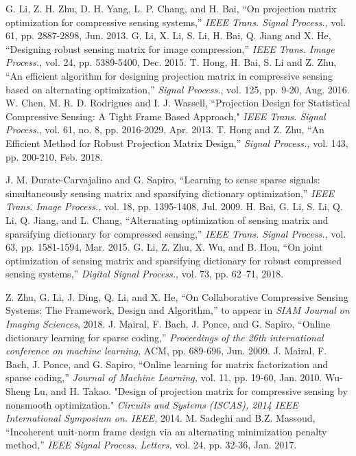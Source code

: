 \documentclass[final,5p,times,twocolumn]{elsarticle}
\begin{document}
\begin{thebibliography}{255}
G. Li, Z. H. Zhu, D. H. Yang, L. P. Chang, and H. Bai, ``On projection matrix optimization for compressive sensing systems,'' {\it IEEE Trans. Signal Process.,} vol. 61, pp. 2887-2898, Jun. 2013.
 G. Li, X. Li, S. Li, H. Bai, Q. Jiang and X. He, ``Designing robust sensing matrix for image compression,'' {\it IEEE Trans. Image Process.,} vol. 24, pp. 5389-5400, Dec. 2015.
T. Hong, H. Bai, S. Li and Z. Zhu, ``An efficient algorithm for designing projection matrix in compressive sensing based on alternating optimization,'' {\it Signal Process.}, vol. 125, pp. 9-20, Aug. 2016.
	W. Chen, M. R. D. Rodrigues and I. J. Wassell, ``Projection Design for Statistical Compressive Sensing: A Tight Frame Based Approach," {\em IEEE Trans. Signal Process.}, vol. 61, no. 8, pp. 2016-2029, Apr. 2013.
	T. Hong and Z. Zhu, ``An Efficient Method for Robust Projection Matrix Design,'' {\it Signal Process.,} vol. 143, pp. 200-210, Feb. 2018.

J. M. Durate-Carvajalino and G. Sapiro, ``Learning to sense sparse signals: simultaneously sensing matrix and sparsifying dictionary optimization,'' {\it IEEE Trans. Image Process.,} vol. 18, pp. 1395-1408, Jul. 2009.
H. Bai, G. Li, S. Li, Q. Li, Q. Jiang, and L. Chang, ``Alternating optimization of sensing matrix and sparsifying dictionary for compressed sensing,'' {\it IEEE Trans. Signal Process.,} vol. 63, pp. 1581-1594, Mar. 2015.
G. Li, Z. Zhu, X. Wu, and B. Hou, ``On joint optimization of sensing matrix and sparsifying dictionary for robust compressed sensing systems,'' {\it Digital Signal Process.}, vol. 73, pp. 62--71, 2018.

Z. Zhu, G. Li, J. Ding, Q. Li, and X. He,  ``On Collaborative Compressive Sensing Systems: The Framework, Design and Algorithm,'' to appear in {\it SIAM Journal on Imaging Sciences}, 2018.
	J. Mairal, F. Bach, J. Ponce, and G. Sapiro, ``Online dictionary learning for sparse coding,'' {\it Proceedings of the 26th international conference on machine learning,} ACM, pp. 689-696, Jun. 2009.
	 J. Mairal, F. Bach, J. Ponce, and G. Sapiro, ``Online learning for matrix factorization and sparse coding,'' {\it Journal of Machine Learning,} vol. 11, pp. 19-60, Jan. 2010.
	 Wu-Sheng Lu, and H. Takao. "Design of projection matrix for compressive sensing by nonsmooth optimization." {\it Circuits and Systems (ISCAS), 2014 IEEE International Symposium on. IEEE,} 2014.
	M. Sadeghi and B.Z. Massoud, ``Incoherent unit-norm frame design via an alternating minimization penalty method,'' {\it IEEE Signal Process. Letters,} vol. 24, pp. 32-36, Jan. 2017.
	

\end{thebibliography}
\end{document}
